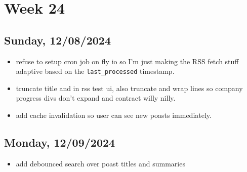 \newpage
\section{Week 24}

\subsection{Sunday, 12/08/2024}
\begin{itemize}
    \item refuse to setup cron job on fly io so I'm just making the RSS fetch
        stuff adaptive based on the \texttt{last_processed} timestamp.
    \item truncate title and in rss test ui, also truncate and wrap lines so
        company progress divs don't expand and contract willy nilly.
    \item add cache invalidation so user can see new poasts immediately.
\end{itemize}

\subsection{Monday, 12/09/2024}
\begin{itemize}
    \item add debounced search over poast titles and summaries 
\end{itemize}
